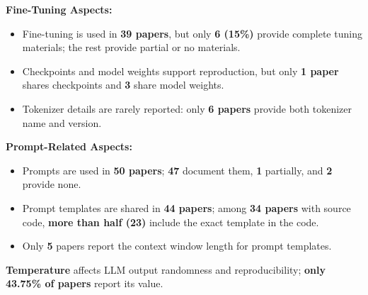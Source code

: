 \documentclass[a0paper,portrait]{baposter}
\begin{document}
\begin{poster}
{\begin{itemize}
  \end{itemize}
\textbf{Fine-Tuning Aspects:}
    \begin{itemize}
        \item Fine-tuning is used in \textbf{39 papers}, but only \textbf{6 (15\%)} provide complete tuning materials; the rest provide partial or no materials.
        \item Checkpoints and model weights support reproduction, but only \textbf{1 paper} shares checkpoints and \textbf{3} share model weights.
        \item Tokenizer details are rarely reported: only \textbf{6 papers} provide both tokenizer name and version.
    \end{itemize}
\textbf{Prompt-Related Aspects:}
    \begin{itemize}
        \item Prompts are used in \textbf{50 papers}; \textbf{47} document them, \textbf{1} partially, and \textbf{2} provide none.
        \item Prompt templates are shared in \textbf{44 papers}; among \textbf{34 papers} with source code, \textbf{more than half (23)} include the exact template in the code.
        \item Only \textbf{5} papers report the context window length for prompt templates.
    \end{itemize}
\textbf{Temperature} affects LLM output randomness and reproducibility; \textbf{only 43.75\% of papers} report its value.    
}



\end{poster}
\end{document}
